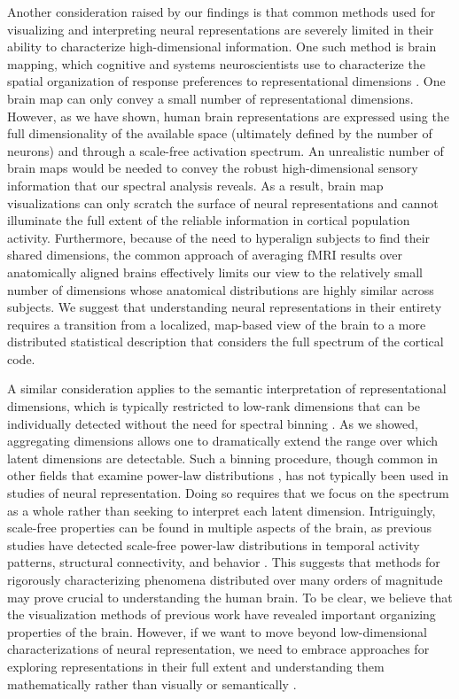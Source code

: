 \documentclass[10pt]{article}
\begin{document}
Another consideration raised by our findings is that common methods used
for visualizing and interpreting neural representations are severely
limited in their ability to characterize high-dimensional information.
One such method is brain mapping, which cognitive and systems
neuroscientists use to characterize the spatial organization of response
preferences to representational dimensions
\autocite{Huth2012,Bao2020,Tarhan2020,Hebart2023,Contier2024}. One brain
map can only convey a small number of representational dimensions.
However, as we have shown, human brain representations are expressed
using the full dimensionality of the available space (ultimately defined
by the number of neurons) and through a scale-free activation spectrum.
An unrealistic number of brain maps would be needed to convey the robust
high-dimensional sensory information that our spectral analysis reveals.
As a result, brain map visualizations can only scratch the surface of
neural representations and cannot illuminate the full extent of the
reliable information in cortical population activity. Furthermore,
because of the need to hyperalign subjects to find their shared
dimensions, the common approach of averaging fMRI results over
anatomically aligned brains effectively limits our view to the
relatively small number of dimensions whose anatomical distributions are
highly similar across subjects. We suggest that understanding neural
representations in their entirety requires a transition from a
localized, map-based view of the brain to a more distributed statistical
description that considers the full spectrum of the cortical code.

A similar consideration applies to the semantic interpretation of
representational dimensions, which is typically restricted to low-rank
dimensions that can be individually detected without the need for
spectral binning \autocite{Huth2012,Khosla2022,Tarhan2020,Hebart2023}.
As we showed, aggregating dimensions allows one to dramatically extend
the range over which latent dimensions are detectable. Such a binning
procedure, though common in other fields that examine power-law
distributions \autocite{Lin2023}, has not typically been used in studies
of neural representation. Doing so requires that we focus on the
spectrum as a whole rather than seeking to interpret each latent
dimension. Intriguingly, scale-free properties can be found in multiple
aspects of the brain, as previous studies have detected scale-free
power-law distributions in temporal activity patterns, structural
connectivity, and behavior \autocite{He2014,Lynn2024,Kello2010}. This
suggests that methods for rigorously characterizing phenomena
distributed over many orders of magnitude may prove crucial to
understanding the human brain. To be clear, we believe that the
visualization methods of previous work have revealed important
organizing properties of the brain. However, if we want to move beyond
low-dimensional characterizations of neural representation, we need to
embrace approaches for exploring representations in their full extent
and understanding them mathematically rather than visually or
semantically \autocite{Roads2024}.
\end{document}
